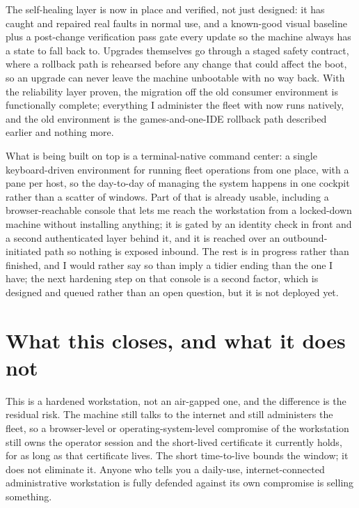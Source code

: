 \documentclass[12pt]{article}
\begin{document}
The self-healing layer is now in place and verified, not just designed: it has caught and repaired real faults in normal use, and a known-good visual baseline plus a post-change verification pass gate every update so the machine always has a state to fall back to. Upgrades themselves go through a staged safety contract, where a rollback path is rehearsed before any change that could affect the boot, so an upgrade can never leave the machine unbootable with no way back. With the reliability layer proven, the migration off the old consumer environment is functionally complete; everything I administer the fleet with now runs natively, and the old environment is the games-and-one-IDE rollback path described earlier and nothing more.

What is being built on top is a terminal-native command center: a single keyboard-driven environment for running fleet operations from one place, with a pane per host, so the day-to-day of managing the system happens in one cockpit rather than a scatter of windows. Part of that is already usable, including a browser-reachable console that lets me reach the workstation from a locked-down machine without installing anything; it is gated by an identity check in front and a second authenticated layer behind it, and it is reached over an outbound-initiated path so nothing is exposed inbound. The rest is in progress rather than finished, and I would rather say so than imply a tidier ending than the one I have; the next hardening step on that console is a second factor, which is designed and queued rather than an open question, but it is not deployed yet.

\section{What this closes, and what it does not}

This is a hardened workstation, not an air-gapped one, and the difference is the residual risk. The machine still talks to the internet and still administers the fleet, so a browser-level or operating-system-level compromise of the workstation still owns the operator session and the short-lived certificate it currently holds, for as long as that certificate lives. The short time-to-live bounds the window; it does not eliminate it. Anyone who tells you a daily-use, internet-connected administrative workstation is fully defended against its own compromise is selling something.
\end{document}
